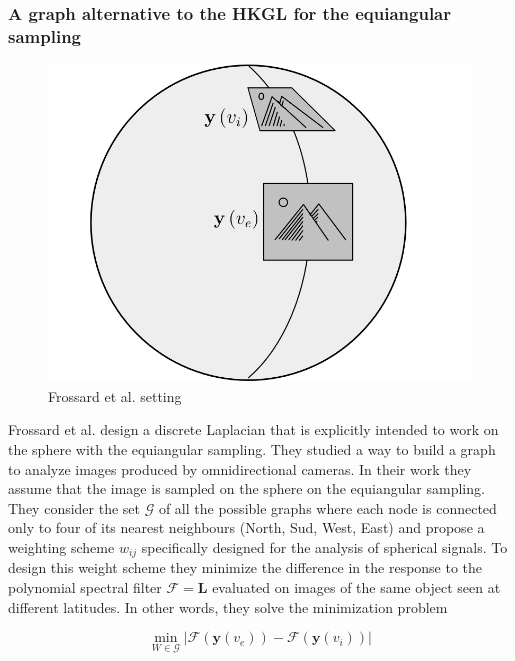 \subsubsection{A graph alternative to the HKGL for the equiangular sampling}
\begin{figure}	
	\begin{center}
		\includegraphics[width=0.9\linewidth]{figs/Chapter3/frossard2.png}
	\end{center}
	\caption{\label{fig:frossard2}Frossard et al. setting}
\end{figure} 
Frossard et al. \cite{Frossard2017GraphBasedCO} design a discrete Laplacian that is explicitly intended to work on the sphere with the equiangular sampling. They studied a way to build a graph to analyze images produced by omnidirectional cameras. In their work they assume that the image is sampled on the sphere on the equiangular sampling. They consider the set $\mathcal G$ of all the possible graphs where each node is connected only to four of its nearest neighbours (North, Sud, West, East) and propose a weighting scheme $w_{ij}$ specifically designed for the analysis of spherical signals. To design this weight scheme they minimize the difference in the response to the polynomial spectral filter $\mathcal F = \mathbf L$ evaluated on images of the same object seen at different latitudes. In other words, they solve the minimization problem

\begin{equation}\label{eq:minimization frossard}
	\min_{W\in\mathcal G} \left|\mathcal{F}\left(\mathbf{y}\left(v_{ e}\right)\right)-\mathcal{F}\left(\mathbf{y}\left(v_{ i}\right)\right)\right|
\end{equation}

